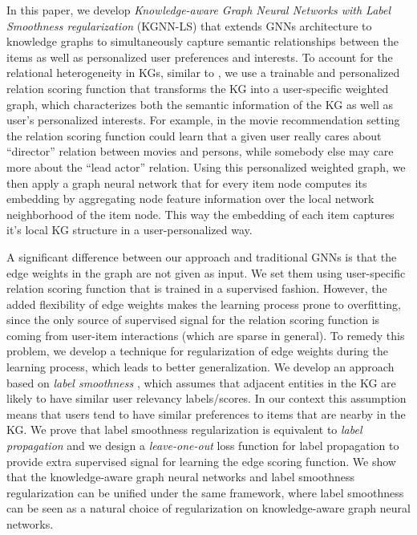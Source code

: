 \documentclass[sigconf]{acmart}
\begin{document}
	In this paper, we develop \textit{Knowledge-aware Graph Neural Networks with Label Smoothness regularization} (KGNN-LS) that extends GNNs architecture to knowledge graphs to simultaneously capture semantic relationships between the items as well as personalized user preferences and interests.
	To account for the relational heterogeneity in KGs, similar to \cite{wang2019knowledge}, we use a trainable and personalized relation scoring function that transforms the KG into a user-specific weighted graph, which characterizes both the semantic information of the KG as well as user's personalized interests.
	For example, in the movie recommendation setting the relation scoring function could learn that a given user really cares about ``director'' relation between movies and persons, while somebody else may care more about the ``lead actor'' relation.
	Using this personalized weighted graph, we then apply a graph neural network that for every item node computes its embedding by aggregating node feature information over the local network neighborhood of the item node.
	This way the embedding of each item captures it's local KG structure in a user-personalized way.
	
	A significant difference between our approach and traditional GNNs is that the edge weights in the graph are not given as input.
	We set them using user-specific relation scoring function that is trained in a supervised fashion.
	However, the added flexibility of edge weights makes the learning process prone to overfitting, since the only source of supervised signal for the relation scoring function is coming from user-item interactions (which are sparse in general).
	To remedy this problem, we develop a technique for regularization of edge weights during the learning process, which leads to better generalization.
	We develop an approach based on \textit{label smoothness} \cite{zhu2003semi,zhang2007hyperparameter}, which assumes that adjacent entities in the KG are likely to have similar user relevancy labels/scores.
	In our context this assumption means that users tend to have similar preferences to items that are nearby in the KG.
	We prove that label smoothness regularization is equivalent to \textit{label propagation} and we design a \textit{leave-one-out} loss function for label propagation to provide extra supervised signal for learning the edge scoring function.
	We show that the knowledge-aware graph neural networks and label smoothness regularization can be unified under the same framework, where label smoothness can be seen as a natural choice of regularization on knowledge-aware graph neural networks.
	
\end{document}
